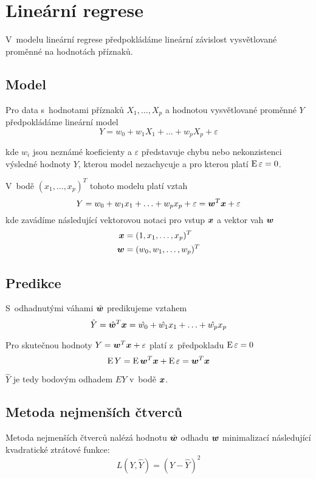 \section{Lineární regrese}

V~modelu lineární regrese předpokládáme lineární závislost vysvětlované proměnné na hodnotách příznaků.

\subsection{Model}

Pro data s~hodnotami příznaků $X_1, \ldots, X_p$ a hodnotou vysvětlované proměnné $Y$ předpokládáme lineární model
\begin{equation*}
    Y = w_0 + w_1 X_1 + \ldots + w_p X_p + \varepsilon
\end{equation*}

kde $w_i$ jsou neznámé koeficienty a $\varepsilon$ představuje chybu nebo nekonzistenci výsledné hodnoty $Y$, kterou model nezachycuje a pro kterou platí $\operatorname{E} \varepsilon = 0$.

V~bodě $(x_1, \ldots, x_p)^T$ tohoto modelu platí vztah \[ Y = w_0 + w_1 x_1 + \ldots + w_p x_p + \varepsilon = \bm{w}^T \bm{x} + \varepsilon \] kde zavádíme následující vektorovou notaci pro vstup $\bm{x}$ a vektor vah $\bm{w}$
\begin{align*}
    \bm{x}  & = (1, x_1, \ldots, x_p)^T   \\
    \bm{w} & = (w_0, w_1, \ldots, w_p)^T
\end{align*}

\subsection{Predikce}

S~odhadnutými váhami $\hat{\bm{w}}$ predikujeme vztahem
\[\hat{Y} = \hat{\bm{w}}^T\bm{x} = \hat{w_0} + \hat{w_1} x_1 + \ldots + \hat{w_p} x_p\]

Pro skutečnou hodnoty $Y = \bm{w}^T \bm{x} + \varepsilon$ platí z~předpokladu $\operatorname{E} \varepsilon = 0$ \[\operatorname{E} Y = \operatorname{E} \bm{w}^T \bm{x} + \operatorname{E} \varepsilon = \bm{w}^T \bm{x}\]

$\hat{Y}$ je tedy bodovým odhadem $EY$ v~bodě $\bm{x}$.

\subsection{Metoda nejmenších čtverců}

Metoda nejmenších čtverců nalézá hodnotu $\hat{\bm{w}}$ odhadu $\bm{w}$ minimalizací následující kvadratické ztrátové funkce: \[L(Y, \hat{Y}) = (Y - \hat{Y})^2\]

